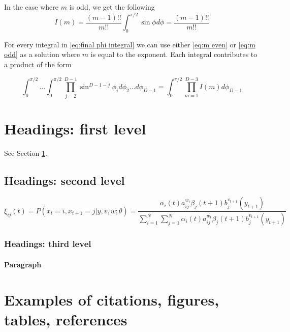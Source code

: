 \documentclass{article}
\begin{document}
In the case where $m$ is odd, we get the following
\begin{equation} \label{eq:m odd}
	I(m) = \frac{(m-1)!!}{m!!}\int_0^{\pi/2}\sin\phi d\phi = \frac{(m-1)!!}{m!!}
\end{equation}

For every integral in \ref{eq:final phi integral} we can use either \ref{eq:m even} or \ref{eq:m odd} as a solution where $m$ is equal to the exponent. Each integral contributes
to a product of the form

\begin{equation}
	\int_0^{\pi/2} \hdots \int_0^{\pi/2} \prod_{j=2}^{D-1}\sin^{D-1-j}\phi_i d\phi_2\hdots d\phi_{D-1} = \int_0^{\pi/2}\prod_{m=1}^{D-3}I(m) d\phi_{D-1}
\end{equation}

\section{Headings: first level}
\label{sec:headings}

\lipsum[4] See Section \ref{sec:headings}.

\subsection{Headings: second level}
\lipsum[5]
\begin{equation} 
	\xi _{ij}(t)=P(x_{t}=i,x_{t+1}=j|y,v,w;\theta)= {\frac {\alpha _{i}(t)a^{w_t}_{ij}\beta _{j}(t+1)b^{v_{t+1}}_{j}(y_{t+1})}{\sum _{i=1}^{N} \sum _{j=1}^{N} \alpha _{i}(t)a^{w_t}_{ij}\beta _{j}(t+1)b^{v_{t+1}}_{j}(y_{t+1})}}
\end{equation}



\subsubsection{Headings: third level}
\lipsum[6]

\paragraph{Paragraph}
\lipsum[7]



\section{Examples of citations, figures, tables, references}
\label{sec:others}
\end{document}
